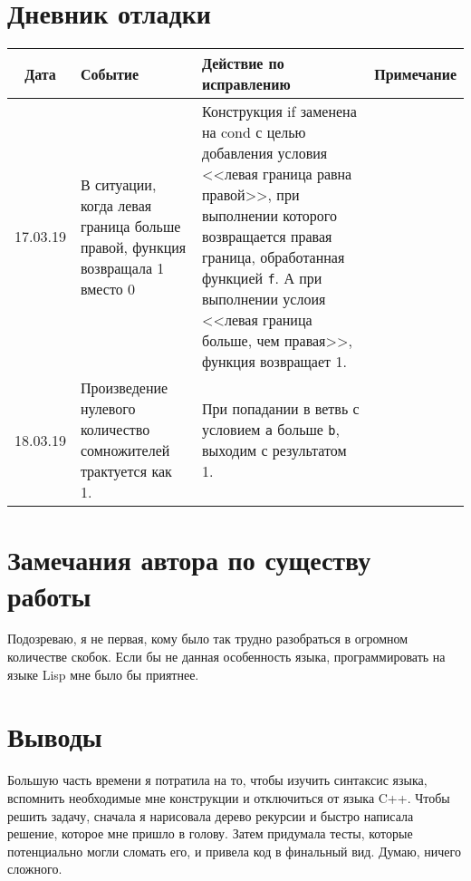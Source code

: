 \documentclass[12pt]{article}
\begin{document}
\section{Дневник отладки}
\begin{tabular}{|c|p{5cm}|p{5cm}|c|}
\hline
Дата & Событие & Действие по исправлению & Примечание \\
\hline
17.03.19 & В ситуации, когда левая граница больше правой, функция возвращала 1 вместо 0 & Конструкция if заменена на cond с целью добавления условия <<левая граница равна правой>>, при выполнении которого возвращается правая граница, обработанная функцией {\tt f}. А при выполнении услоия <<левая граница больше, чем правая>>, функция возвращает 1. & \\
\hline
18.03.19 & Произведение нулевого количество сомножителей трактуется как 1. & При попадании в ветвь с условием {\tt a} больше {\tt b}, выходим с результатом 1. & \\
\hline
\end{tabular}

\section{Замечания автора по существу работы}
Подозреваю, я не первая, кому было так трудно разобраться в огромном количестве скобок. Если бы не данная особенность языка, программировать на языке Lisp мне было бы приятнее.

\section{Выводы}
Большую часть времени я потратила на то, чтобы изучить синтаксис языка, вспомнить необходимые мне конструкции и отключиться от языка C++. Чтобы решить задачу, сначала я нарисовала дерево рекурсии и быстро написала решение, которое мне пришло в голову. Затем придумала тесты, которые потенциально могли сломать его, и привела код в финальный вид.
Думаю, ничего сложного.
\end{document}
